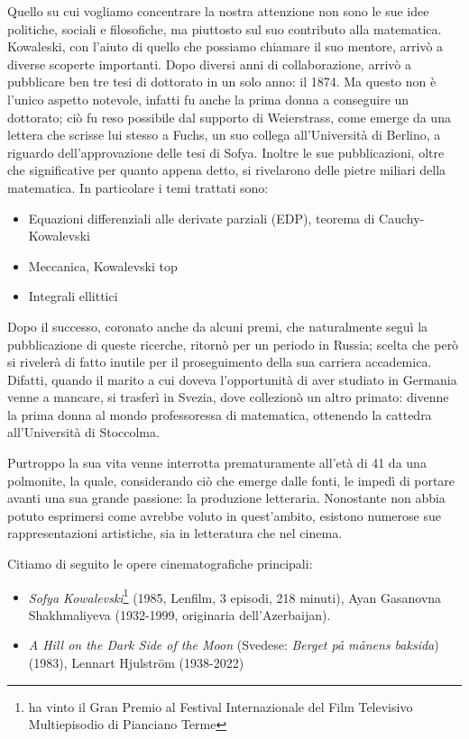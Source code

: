 Quello su cui vogliamo concentrare la nostra attenzione non sono le sue idee politiche, sociali e filosofiche, ma piuttosto sul suo contributo alla matematica. Kowaleski, con l'aiuto di quello che possiamo chiamare il suo mentore, arrivò a diverse scoperte importanti. Dopo diversi anni di collaborazione, arrivò a pubblicare ben tre tesi di dottorato in un solo anno: il 1874. Ma questo non è l'unico aspetto notevole, infatti fu anche la prima donna a conseguire un dottorato; ciò fu reso possibile dal supporto di Weierstrass, come emerge da una lettera che scrisse lui stesso a Fuchs, un suo collega all'Università di Berlino, a riguardo dell'approvazione delle tesi di Sofya. Inoltre le sue pubblicazioni, oltre che significative per quanto appena detto, si rivelarono delle pietre miliari della matematica. In particolare i temi trattati sono:
\begin{itemize}
\item Equazioni differenziali alle derivate parziali (EDP), teorema di Cauchy-Kowalevski
\item Meccanica, Kowalevski top
\item Integrali ellittici
\end{itemize}


Dopo il successo, coronato anche da alcuni premi, che naturalmente seguì la pubblicazione di queste ricerche, ritornò per un periodo in Russia; scelta che però si rivelerà di fatto inutile per il proseguimento della sua carriera accademica. Difatti, quando il marito a cui doveva l'opportunità di aver studiato in Germania venne a mancare, si trasferì in Svezia, dove collezionò un altro primato: divenne la prima donna al mondo professoressa di matematica, ottenendo la cattedra all'Università di Stoccolma.

Purtroppo la sua vita venne interrotta prematuramente all'età di 41 da una polmonite, la quale, considerando ciò che emerge dalle fonti, le impedì di portare avanti una sua grande passione: la produzione letteraria.
Nonostante non abbia potuto esprimersi come avrebbe voluto in quest'ambito, esistono numerose sue rappresentazioni artistiche, sia in letteratura che nel cinema.

Citiamo di seguito le opere cinematografiche principali:
\begin{itemize}
\emergencystretch 3em
\item \textit{Sofya Kowalevski}\footnote{ ha vinto il Gran Premio al Festival Internazionale del Film Televisivo Multiepisodio di Pianciano Terme} (1985, Lenfilm, 3 episodi, 218 minuti), Ayan Gasanovna Shakhmaliyeva (1932-1999,
originaria dell'Azerbaijan).

\item \textit{A Hill on the Dark Side of the Moon} (Svedese: \textit{Berget på månens baksida})(1983), Lennart Hjulström (1938-2022)
\end{itemize}

